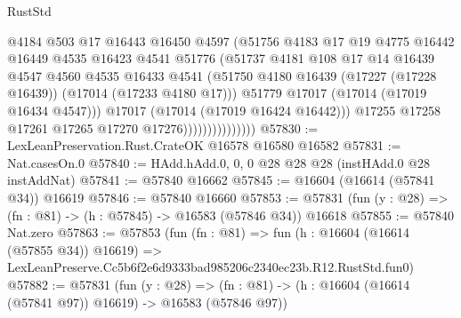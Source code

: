 \begin{lexlean}{RustStd}
\begin{coremodule}
                                  @4184
                                  @503
                                  @17
                                  @16443
                                  @16450
                                  @4597
                                  (@51756
                                    @4183
                                    @17
                                    @19
                                    @4775
                                    @16442
                                    @16449
                                    @4535
                                    @16423
                                    @4541
                                    @51776
                                    (@51737
                                      @4181
                                      @108
                                      @17
                                      @14
                                      @16439
                                      @4547
                                      @4560
                                      @4535
                                      @16433
                                      @4541
                                      (@51750
                                        @4180
                                        @16439
                                        (@17227 (@17228 @16439))
                                        (@17014 (@17233 @4180 @17)))
                                      @51779
                                      @17017
                                      (@17014 (@17019 @16434 @4547)))
                                    @17017
                                    (@17014 (@17019 @16424 @16442)))
                                  @17255
                                  @17258
                                  @17261
                                  @17265
                                  @17270
                                  @17276)))))))))))))))
@57830 := LexLeanPreservation.Rust.CrateOK @16578 @16580 @16582
@57831 := Nat.casesOn.{0}
@57840 := HAdd.hAdd.{0, 0, 0} @28 @28 @28 (instHAdd.{0} @28 instAddNat)
@57841 := @57840 @16662
@57845 := @16604 (@16614 (@57841 @34)) @16619
@57846 := @57840 @16660
@57853 := @57831 (fun (y : @28) => (fn : @81) -> (h : @57845) -> @16583 (@57846 @34)) @16618
@57855 := @57840 Nat.zero
@57863 := @57853
    (fun (fn : @81) =>
    fun (h : @16604 (@16614 (@57855 @34)) @16619) =>
    LexLeanPreserve.Cc5b6f2e6d9333bad985206c2340ec23b.R12.RustStd.fun0)
@57882 := @57831
    (fun (y : @28) =>
    (fn : @81) -> (h : @16604 (@16614 (@57841 @97)) @16619) -> @16583 (@57846 @97))

\end{coremodule}
\end{lexlean}
